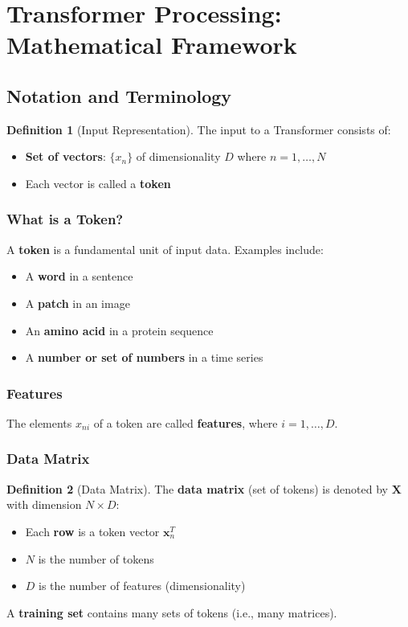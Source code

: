 \documentclass[11pt,a4paper]{article}
\theoremstyle{definition}
\newtheorem{definition}{Definition}[section]
\theoremstyle{plain}
\theoremstyle{remark}
\begin{document}
\section{Transformer Processing: Mathematical Framework}

\subsection{Notation and Terminology}

\begin{definition}[Input Representation]
The input to a Transformer consists of:
\begin{itemize}
    \item \textbf{Set of vectors}: $\{x_n\}$ of dimensionality $D$ where $n = 1, \ldots, N$
    \item Each vector is called a \textbf{token}
\end{itemize}
\end{definition}

\subsubsection{What is a Token?}

A \textbf{token} is a fundamental unit of input data. Examples include:
\begin{itemize}
    \item A \textbf{word} in a sentence
    \item A \textbf{patch} in an image
    \item An \textbf{amino acid} in a protein sequence
    \item A \textbf{number or set of numbers} in a time series
\end{itemize}

\subsubsection{Features}

The elements $x_{ni}$ of a token are called \textbf{features}, where $i = 1, \ldots, D$.

\subsubsection{Data Matrix}

\begin{definition}[Data Matrix]
The \textbf{data matrix} (set of tokens) is denoted by $\mathbf{X}$ with dimension $N \times D$:
\begin{itemize}
    \item Each \textbf{row} is a token vector $\mathbf{x}_n^T$
    \item $N$ is the number of tokens
    \item $D$ is the number of features (dimensionality)
\end{itemize}

A \textbf{training set} contains many sets of tokens (i.e., many matrices).
\end{definition}
\end{document}
